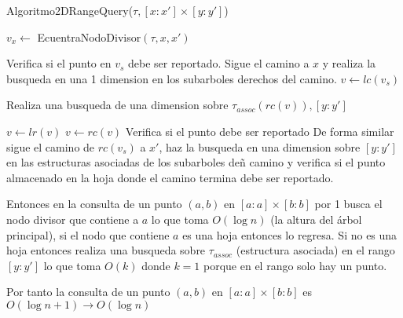\begin{enumerate}
      Algoritmo2DRangeQuery($\tau, [x:x']\times [y:y']$)
      
      \begin{algorithmic}[1]
         \State $v_x \gets$ EcuentraNodoDivisor$(\tau,x,x')$


            \State Verifica si el punto en $v_s$ debe ser reportado.
            \Else 
            \State Sigue el camino a $x$ y realiza la busqueda en una 1 dimension en los subarboles derechos del camino.
            \State $v \gets lc(v_s)$

               \State Realiza una busqueda de una dimension sobre $\tau_{assoc} (rc(v)),[y:y']$

               \State $v\gets lr(v)$
               \Else
               \State $v \gets rc(v)$ 
               \EndIf
            \EndWhile
            \State Verifica si el punto debe ser reportado
            \State De forma similar sigue el camino de $rc(v_s)$ a $x'$, haz la busqueda en una dimension sobre $[y:y']$ en las estructuras asociadas de los subarboles deñ camino y verifica si el punto almacenado en la hoja donde el camino termina debe ser reportado.
         \EndIf
      \end{algorithmic}
      Entonces en la consulta de un punto $(a,b)$ en $[a:a]\times[b:b]$ por 1 busca el nodo divisor que contiene a $a$ lo que toma $O(\log n)$ (la altura del árbol principal), si el nodo que contiene $a$ es una hoja entonces lo regresa. Si no es una hoja entonces realiza una busqueda sobre $\tau_{assoc}$ (estructura asociada) en el rango $[y:y']$ lo que toma $O(k)$ donde $k=1$ porque en el rango solo hay un punto.

      Por tanto la consulta de un punto $(a,b)$ en $[a:a]\times[b:b]$ es $O(\log n + 1) \rightarrow O(\log n)$

\end{enumerate}
\bigskip
